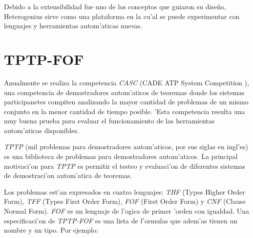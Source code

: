 Debido a la extensibilidad fue uno de los conceptos que guiaron su diseño, Heterogenius sirve como  una plataforma en la cu'al se puede experimentar con lenguajes y herramientas autom'aticas nuevas.


\section{TPTP-FOF}

Anualmente se realiza la competencia \textit{CASC} (CADE ATP System Competition \cite{casc}), una competencia de demostradores autom'aticos de teoremas donde los sistemas participanetes compiten analizando la mayor cantidad de problemas de un mismo conjunto en la menor cantidad de tiempo posible. 'Esta competencia resulta una muy buena prueba para evaluar el funcionamiento de las herramientas autom'aticas disponibles.


\textit{TPTP} (mil problemas para demostradores autom'aticos, por sus siglas en ingl'es) \cite{tptp} es una biblioteca de problemas para demostradores autom'aticos. La principal motivaci'on para \textit{TPTP} es permitir el testeo y evaluaci'on de diferentes sistemas de demostraci'on autom'atica de teoremas.

Los problemas est'an expresados en cuatro lenguajes: \textit{THF} (Types Higher Order Form), \textit{TFF} (Types First Order Form), \textit{FOF} (First Order Form) y \textit{CNF} (Clause Normal Form). \textit{FOF} \cite{fof} es un lenguaje de l'ogica de primer 'orden con igualdad. Una especificaci'on de \textit{TPTP-FOF} es una lista de f'ormulas que adem'as tienen un nombre y un tipo. Por ejemplo:



